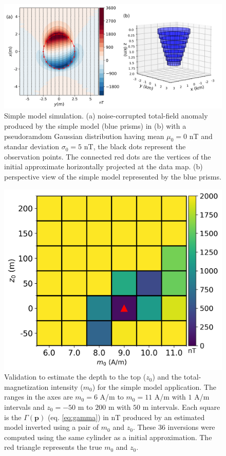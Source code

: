 \begin{figure}
    \centering
    \includegraphics[scale=.5]{figures/simple_model_data.png}
    \caption{Simple model simulation. (a) noise-corrupted total-field anomaly produced by the simple model (blue prisms) in (b) with a pseudoramdom Gaussian distribution having mean $\mu_0 = 0$ nT and standar deviation $\sigma_0 = 5$ nT, the black dots represent the observation points. The connected red dots are the vertices of the initial approximate horizontally projected at the data map. (b) perspective view of the simple model represented by the blue prisms.
}
    \label{fig:simple_model}
\end{figure}

\begin{figure}
	\centering
	\includegraphics[scale=.75]{figures/simple_gamma.png}
	\caption{Validation to estimate the depth to the top ($ z_0 $) and the total-magnetization intensity ($ m_0 $) for the simple model application. The ranges in the axes are $m_0 = 6$ A/m to $m_0=11$ A/m with $1$ A/m intervals and $z_0=-50$ m to $200$ m with $50$ m intervals. Each square is the $\Gamma (\mathbf{p})$ (eq. \ref{eq:gamma}) in nT produced by an estimated model inverted using a pair of $m_0$ and $z_0$. These 36 inversions were computed using the same cylinder as a initial approximation. The red triangle represents the true $m_0$ and $z_0$.
	}
	\label{fig:simple_map}
\end{figure}

